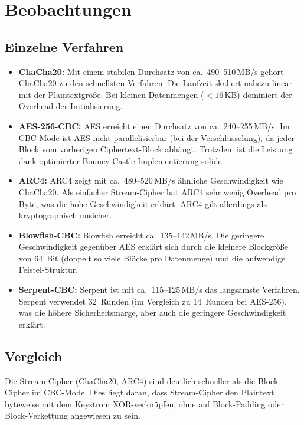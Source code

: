 \documentclass[
    fontsize=12pt,          %
    paper=a4,               %
    numbers=noenddot,       %
    listof=totoc,           %
    listof=entryprefix,     %
    listof=nochaptergap,    %
    bibliography=totoc,     %
    parskip=half,           %
    openany                 %
]{scrbook}
\begin{document}
\section*{Beobachtungen}

\subsection*{Einzelne Verfahren}

\begin{itemize}
    \item \textbf{ChaCha20:} Mit einem stabilen Durchsatz von ca.\ 490--510\,MB/s gehört ChaCha20 zu den schnellsten Verfahren. Die Laufzeit skaliert nahezu linear mit der Plaintextgröße. Bei kleinen Datenmengen ($< 16$\,KB) dominiert der Overhead der Initialisierung.

    \item \textbf{AES-256-CBC:} AES erreicht einen Durchsatz von ca.\ 240--255\,MB/s. Im CBC-Mode ist AES nicht parallelisierbar (bei der Verschlüsselung), da jeder Block vom vorherigen Ciphertext-Block abhängt. Trotzdem ist die Leistung dank optimierter Bouncy-Castle-Implementierung solide.

    \item \textbf{ARC4:} ARC4 zeigt mit ca.\ 480--520\,MB/s ähnliche Geschwindigkeit wie ChaCha20. Als einfacher Stream-Cipher hat ARC4 sehr wenig Overhead pro Byte, was die hohe Geschwindigkeit erklärt. ARC4 gilt allerdings als kryptographisch unsicher.

    \item \textbf{Blowfish-CBC:} Blowfish erreicht ca.\ 135--142\,MB/s. Die geringere Geschwindigkeit gegenüber AES erklärt sich durch die kleinere Blockgröße von 64~Bit (doppelt so viele Blöcke pro Datenmenge) und die aufwendige Feistel-Struktur.

    \item \textbf{Serpent-CBC:} Serpent ist mit ca.\ 115--125\,MB/s das langsamste Verfahren. Serpent verwendet 32~Runden (im Vergleich zu 14~Runden bei AES-256), was die höhere Sicherheitsmarge, aber auch die geringere Geschwindigkeit erklärt.
\end{itemize}


\subsection*{Vergleich}

Die Stream-Cipher (ChaCha20, ARC4) sind deutlich schneller als die Block-Cipher im CBC-Mode.
Dies liegt daran, dass Stream-Cipher den Plaintext byteweise mit dem Keystrom XOR-verknüpfen, ohne auf Block-Padding oder Block-Verkettung angewiesen zu sein.
\end{document}
